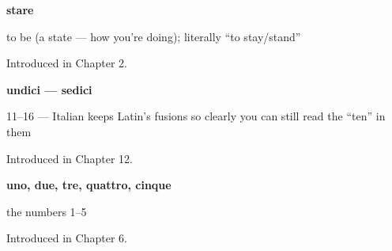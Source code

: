 \noindent\begin{minipage}[t]{\linewidth}
\raggedright
\textbf{stare}\par
\small to be (a state — how you're doing); literally \textquotedblleft{}to stay/stand\textquotedblright{}\par
\footnotesize Introduced in Chapter 2.
\end{minipage}\par\medskip

\noindent\begin{minipage}[t]{\linewidth}
\raggedright
\textbf{undici — sedici}\par
\small 11–16 — Italian keeps Latin's fusions so clearly you can still read the \textquotedblleft{}ten\textquotedblright{} in them\par
\footnotesize Introduced in Chapter 12.
\end{minipage}\par\medskip

\noindent\begin{minipage}[t]{\linewidth}
\raggedright
\textbf{uno, due, tre, quattro, cinque}\par
\small the numbers 1–5\par
\footnotesize Introduced in Chapter 6.
\end{minipage}\par\medskip
